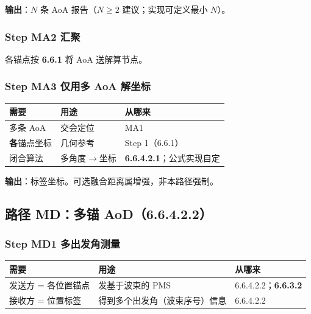 \documentclass[11pt,a4paper]{ctexart}
\begin{document}
\textbf{输出}：$N$ 条 AoA 报告（$N\ge 2$ 建议；实现可定义最小 $N$）。

\subsubsection{Step MA2 汇聚}

各锚点按 \textbf{6.6.1} 将 AoA 送解算节点。

\subsubsection{Step MA3 仅用多 AoA 解坐标}

\begin{table}[h]
\centering
\small
\begin{tabular}{L{3.4cm}L{4.8cm}L{4.8cm}}
\toprule
\textbf{需要} & \textbf{用途} & \textbf{从哪来} \\
\midrule
多条 AoA & 交会定位 & MA1 \\
\textbf{各}锚点坐标 & 几何参考 & Step 1（6.6.1） \\
闭合算法 & 多角度$\rightarrow$坐标 & \textbf{6.6.4.2.1}；公式实现自定 \\
\bottomrule
\end{tabular}
\end{table}

\textbf{输出}：标签坐标。可选融合距离属增强，非本路径强制。

\subsection{路径 MD：多锚 AoD（6.6.4.2.2）}
\label{sec:md}

\subsubsection{Step MD1 多出发角测量}

\begin{table}[h]
\centering
\small
\begin{tabular}{L{3.4cm}L{4.8cm}L{4.8cm}}
\toprule
\textbf{需要} & \textbf{用途} & \textbf{从哪来} \\
\midrule
发送方 = 各位置锚点 & 发基于波束的 PMS & 6.6.4.2.2；\textbf{6.6.3.2} \\
接收方 = 位置标签 & 得到多个出发角（波束序号）信息 & 6.6.4.2.2 \\
\bottomrule
\end{tabular}
\end{table}
\end{document}
